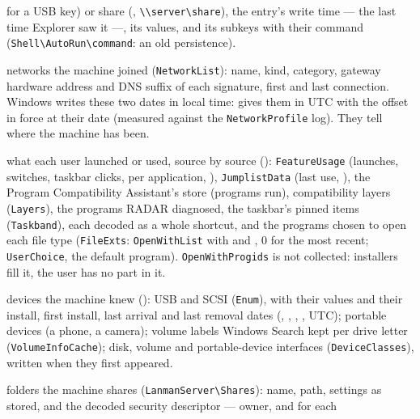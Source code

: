 \documentclass[11pt,a4paper,oneside]{report}
\begin{document}
\begin{description}[style=nextline,leftmargin=1.2em]
         for a USB key) or share (,
        \texttt{\textbackslash\textbackslash server\textbackslash share}), the
        entry's write time --- the last time Explorer saw it ---, its values,
        and its subkeys with their command
        (\texttt{Shell\textbackslash AutoRun\textbackslash command}: an old
        persistence).
  \item[\fichier{known\_networks.json}] networks the machine joined
        (\texttt{NetworkList}): name, kind, category, gateway hardware address
        and DNS suffix of each signature, first and last connection. Windows
        writes these two dates in local time: \wac{} gives them in UTC with the
        offset in force at their date (measured against the
        \texttt{NetworkProfile} log). They tell where the machine has been.
  \item[\fichier{program\_usage.json}] what each user launched or used,
        source by source (): \texttt{FeatureUsage} (launches,
        switches, taskbar clicks, per application, ),
        \texttt{JumplistData} (last use, ), the Program
        Compatibility Assistant's store (programs run), compatibility layers
        (\texttt{Layers}), the programs RADAR diagnosed, the taskbar's pinned
        items (\texttt{Taskband}), each decoded as a whole shortcut, and the
        programs chosen to open each file type (\texttt{FileExts}:
        \texttt{OpenWithList} with  and ,
        0 for the most recent; \texttt{UserChoice}, the default program).
        \texttt{OpenWithProgids} is not collected: installers fill it, the user
        has no part in it.
  \item[\fichier{devices.json}] devices the machine knew ():
        USB and SCSI (\texttt{Enum}), with their values and their install, first
        install, last arrival and last removal dates (,
        , , , UTC);
        portable devices (a phone, a camera); volume labels Windows Search kept
        per drive letter (\texttt{VolumeInfoCache}); disk, volume and
        portable-device interfaces (\texttt{DeviceClasses}), written when they
        first appeared.
  \item[\fichier{network\_shares.json}] folders the machine shares
        (\texttt{LanmanServer\textbackslash Shares}): name, path, settings as
        stored, and the decoded security descriptor --- owner, and for each

\end{description}
\end{document}
